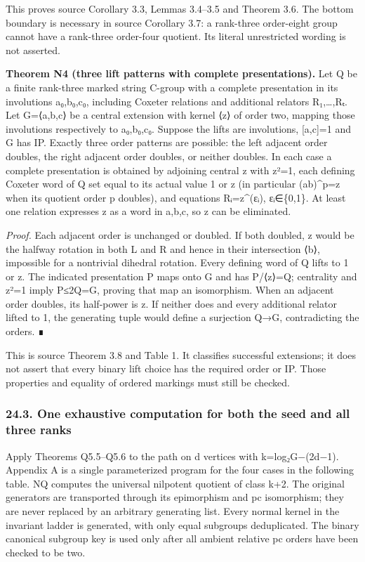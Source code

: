 \documentclass[
  10pt,
  letterpaper,
]{article}
\begin{document}
This proves source Corollary 3.3, Lemmas 3.4--3.5 and Theorem 3.6. The
bottom boundary is necessary in source Corollary 3.7: a rank-three
order-eight group cannot have a rank-three order-four quotient. Its
literal unrestricted wording is not asserted.

\textbf{Theorem N4 (three lift patterns with complete presentations).}
Let Q be a finite rank-three marked string C-group with a complete
presentation in its involutions a₀,b₀,c₀, including Coxeter relations
and additional relators R₁,\ldots,Rₜ. Let G=⟨a,b,c⟩ be a central
extension with kernel ⟨z⟩ of order two, mapping those involutions
respectively to a₀,b₀,c₀. Suppose the lifts are involutions, {[}a,c{]}=1
and G has IP. Exactly three order patterns are possible: the left
adjacent order doubles, the right adjacent order doubles, or neither
doubles. In each case a complete presentation is obtained by adjoining
central z with z²=1, each defining Coxeter word of Q set equal to its
actual value 1 or z (in particular (ab)\^{}p=z when its quotient order p
doubles), and equations Rᵢ=z\^{}(εᵢ), εᵢ∈\{0,1\}. At least one relation
expresses z as a word in a,b,c, so z can be eliminated.

\emph{Proof.} Each adjacent order is unchanged or doubled. If both
doubled, z would be the halfway rotation in both L and R and hence in
their intersection ⟨b⟩, impossible for a nontrivial dihedral rotation.
Every defining word of Q lifts to 1 or z. The indicated presentation P
maps onto G and has P/⟨z⟩=Q; centrality and z²=1 imply
\textbar P\textbar≤2\textbar Q\textbar=\textbar G\textbar, proving that
map an isomorphism. When an adjacent order doubles, its half-power is z.
If neither does and every additional relator lifted to 1, the generating
tuple would define a surjection Q→G, contradicting the orders. ∎

This is source Theorem 3.8 and Table 1. It classifies successful
extensions; it does not assert that every binary lift choice has the
required order or IP. Those properties and equality of ordered markings
must still be checked.

\subsubsection{24.3. One exhaustive computation for both the seed and
all three
ranks}\label{one-exhaustive-computation-for-both-the-seed-and-all-three-ranks}

Apply Theorems Q5.5--Q5.6 to the path on d vertices with
k=log₂\textbar G\textbar−(2d−1). Appendix A is a single parameterized
program for the four cases in the following table. NQ computes the
universal nilpotent quotient of class k+2. The original generators are
transported through its epimorphism and pc isomorphism; they are never
replaced by an arbitrary generating list. Every normal kernel in the
invariant ladder is generated, with only equal subgroups deduplicated.
The binary canonical subgroup key is used only after all ambient
relative pc orders have been checked to be two.
\end{document}
